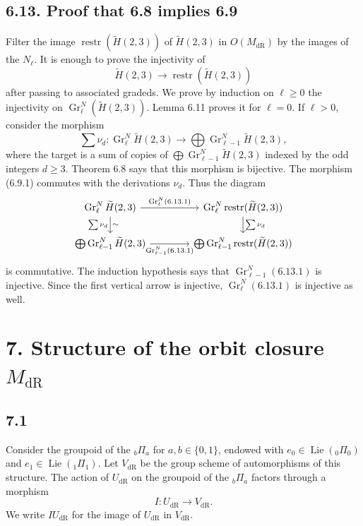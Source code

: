 \documentclass[10pt]{article}
\newcommand{\Lie}{\operatorname{Lie}}
\newcommand{\dR}{\mathrm{dR}}
\begin{document}
\subsection*{6.13. Proof that 6.8 implies 6.9}
Filter the image $\operatorname{restr}(\widetilde H(2,3))$ of $\widetilde H(2,3)$ in $O(M_{\dR})$ by the images of the $N_{\ell}$. It is enough to prove the injectivity of
\begin{equation}
\widetilde H(2,3)\longrightarrow \operatorname{restr}(\widetilde H(2,3))
\tag{6.13.1}
\end{equation}
after passing to associated gradeds. We prove by induction on $\ell\geq0$ the injectivity on $\operatorname{Gr}^{N}_{\ell}(\widetilde H(2,3))$. Lemma 6.11 proves it for $\ell=0$. If $\ell>0$, consider the morphism
\[
\sum\nu_d:\operatorname{Gr}^{N}_{\ell}\widetilde H(2,3)\longrightarrow \bigoplus \operatorname{Gr}^{N}_{\ell-1}\widetilde H(2,3),
\]
where the target is a sum of copies of $\bigoplus \operatorname{Gr}^{N}_{\ell-1}\widetilde H(2,3)$ indexed by the odd integers $d\geq3$. Theorem 6.8 says that this morphism is bijective. The morphism (6.9.1) commutes with the derivations $\nu_d$. Thus the diagram
\[
\begin{tikzcd}[column sep=4.0em,row sep=1.7em]
\operatorname{Gr}^{N}_{\ell}\widetilde H(2,3) \arrow[r,"\operatorname{Gr}^{N}_{\ell}(6.13.1)"] \arrow[d,"\sum\nu_d"',"\sim"] &
\operatorname{Gr}^{N}_{\ell}\operatorname{restr}(\widetilde H(2,3)) \arrow[d,"\sum\nu_d"]\\
\bigoplus\operatorname{Gr}^{N}_{\ell-1}\widetilde H(2,3) \arrow[r,"\operatorname{Gr}^{N}_{\ell-1}(6.13.1)"'] &
\bigoplus\operatorname{Gr}^{N}_{\ell-1}\operatorname{restr}(\widetilde H(2,3))
\end{tikzcd}
\]
is commutative. The induction hypothesis says that $\operatorname{Gr}^{N}_{\ell-1}(6.13.1)$ is injective. Since the first vertical arrow is injective, $\operatorname{Gr}^{N}_{\ell}(6.13.1)$ is injective as well.

\section*{7. Structure of the orbit closure $M_{\dR}$}

\subsection*{7.1}
Consider the groupoid of the ${}_b\Pi_a$ for $a,b\in\{0,1\}$, endowed with $e_0\in\Lie({}_0\Pi_0)$ and $e_1\in\Lie({}_1\Pi_1)$. Let $V_{\dR}$ be the group scheme of automorphisms of this structure. The action of $U_{\dR}$ on the groupoid of the ${}_b\Pi_a$ factors through a morphism
\begin{equation}
I:U_{\dR}\longrightarrow V_{\dR}.
\tag{7.1.1}
\end{equation}
We write $IU_{\dR}$ for the image of $U_{\dR}$ in $V_{\dR}$.
\end{document}
